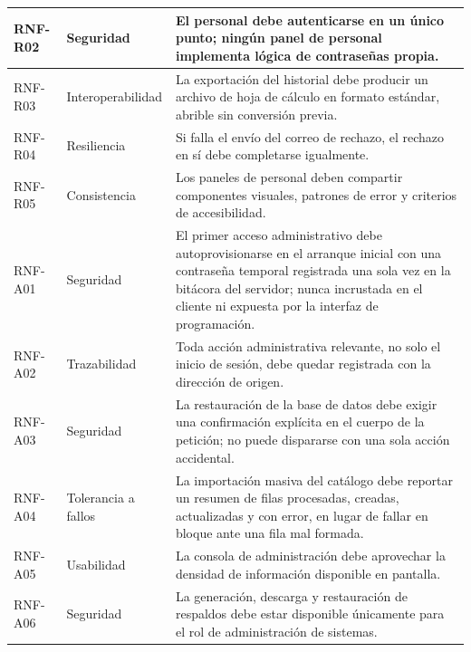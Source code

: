 \begin{longtable}{|p{1.7cm}|p{2.7cm}|p{9.7cm}|}
		RNF-R02 & Seguridad & El personal debe autenticarse en un único punto; ningún panel de
		personal implementa lógica de contraseñas propia. \\ \hline
	
		RNF-R03 & Interoperabilidad & La exportación del historial debe producir un archivo de hoja
		de cálculo en formato estándar, abrible sin conversión previa. \\ \hline
	
		RNF-R04 & Resiliencia & Si falla el envío del correo de rechazo, el rechazo en sí debe
		completarse igualmente. \\ \hline
	
		RNF-R05 & Consistencia & Los paneles de personal deben compartir componentes visuales,
		patrones de error y criterios de accesibilidad. \\ \hline
	
		RNF-A01 & Seguridad & El primer acceso administrativo debe autoprovisionarse en el arranque
		inicial con una contraseña temporal registrada una sola vez en la bitácora del servidor;
		nunca incrustada en el cliente ni expuesta por la interfaz de programación. \\ \hline
	
		RNF-A02 & Trazabilidad & Toda acción administrativa relevante, no solo el inicio de sesión,
		debe quedar registrada con la dirección de origen. \\ \hline
	
		RNF-A03 & Seguridad & La restauración de la base de datos debe exigir una confirmación
		explícita en el cuerpo de la petición; no puede dispararse con una sola acción accidental.
		\\ \hline
	
		RNF-A04 & Tolerancia a fallos & La importación masiva del catálogo debe reportar un resumen
		de filas procesadas, creadas, actualizadas y con error, en lugar de fallar en bloque ante una
		fila mal formada. \\ \hline
	
		RNF-A05 & Usabilidad & La consola de administración debe aprovechar la densidad de
		información disponible en pantalla. \\ \hline
	
		RNF-A06 & Seguridad & La generación, descarga y restauración de respaldos debe estar
		disponible únicamente para el rol de administración de sistemas. \\ \hline
	\end{longtable}
	
